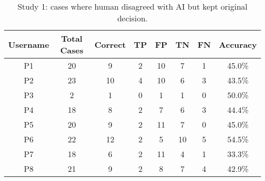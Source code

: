 \begin{table}[]
\caption{
Study 1: cases where human disagreed with AI but kept original decision.}
\begin{tabular}{@{}cccccccc@{}}
\toprule
\textbf{Username} & \textbf{Total Cases} &  \textbf{Correct} & \textbf{TP} & \textbf{FP} & \textbf{TN} & \textbf{FN} & \textbf{Accuracy} \\
\midrule
P1   & 20             & 9                & 2           & 10          & 7           & 1           & 45.0\%         \\
P2  & 23             & 10               & 4           & 10          & 6           & 3           & 43.5\%     \\
P3         & 2              & 1                & 0           & 1           & 1           & 0           & 50.0\%          \\
P4   & 18             & 8                & 2           & 7           & 6           & 3           & 44.4\%     \\
P5    & 20             & 9                & 2           & 11          & 7           & 0           & 45.0\%         \\
P6    & 22             & 12               & 2           & 5           & 10          & 5           & 54.5\%     \\
P7      & 18             & 6                & 2           & 11          & 4           & 1           & 33.3\%     \\
P8 & 21             & 9                & 2           & 8           & 7           & 4           & 42.9\%     \\ \bottomrule
\end{tabular}
\label{tab:study1-fine-3}
\end{table}


